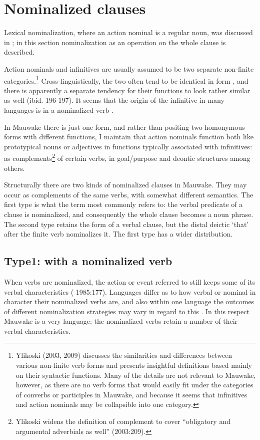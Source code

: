 \section{Nominalized clauses}
\hypertarget{RefHeading22241935131865}{}
Lexical nominalization, where an action nominal is a regular noun, was discussed in ; in this section nominalization as an operation on the whole clause is described.

Action nominals and infinitives are usually assumed to be two separate non-finite categories.\footnote{Ylikoski (2003, 2009) discusses the similarities and differences between various non-finite verb forms and presents insightful definitions based mainly on their syntactic functions. Many of the details are not relevant to Mauwake, however, as there are no verb forms that would easily fit under the categories of converbs or participles in Mauwake, and because it seems that infinitives and action nominals may be collapsible into one category.} Cross-linguistically, the two often tend to be identical in form \citep[224]{Ylikoski2003}, and there is apparently a separate tendency for their functions to look rather similar as well (ibid. 196-197). It seems that the origin of the infinitive in many languages is in a nominalized verb \citep[69]{Noonan2007}. 

In Mauwake there is just one form, and rather than positing two homonymous forms with different functions, I maintain that action nominals function both like prototypical nouns or adjectives  in functions typically associated with infinitives: as complements\footnote{Ylikoski widens the definition of complement to cover ``obligatory and argumental adverbials as well'' (2003:209).} of certain verbs, in goal/purpose and deontic structures among others.  

Structurally there are two kinds of nominalized clauses in Mauwake. They may occur as complements of the same verbs, with somewhat different semantics. The first type is what the term  most commonly refers to: the verbal predicate of a clause is nominalized, and consequently the whole clause becomes a noun phrase. The second type retains the form of a verbal clause, but the distal deictic  `that' after the finite verb nominalizes it.  The first type has a wider distribution.

\subsection{Type1: with a nominalized verb}
\hypertarget{RefHeading22261935131865}{}
When verbs are nominalized, the action or event referred to still keeps some of its verbal characteristics ( 1985:177). Languages differ as to how verbal or nominal in character their nominalized verbs are, and also within one language the outcomes of different nominalization strategies may vary in regard to this \citep[344]{ComrieEtAl2007}%
. In this respect Mauwake is a very  language: the nominalized verbs retain a number of their verbal characteristics.


